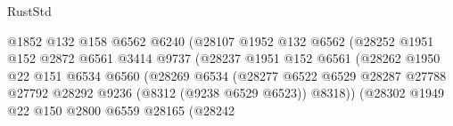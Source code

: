 \begin{lexlean}{RustStd}
\begin{coremodule}
                                            @1852
                                            @132
                                            @158
                                            @6562
                                            @6240
                                            (@28107
                                              @1952
                                              @132
                                              @6562
                                              (@28252
                                                @1951
                                                @152
                                                @2872
                                                @6561
                                                @3414
                                                @9737
                                                (@28237
                                                  @1951
                                                  @152
                                                  @6561
                                                  (@28262
                                                    @1950
                                                    @22
                                                    @151
                                                    @6534
                                                    @6560
                                                    (@28269
                                                      @6534
                                                      (@28277
                                                        @6522
                                                        @6529
                                                        @28287
                                                        @27788
                                                        @27792
                                                        @28292
                                                        @9236
                                                        (@8312 (@9238 @6529 @6523))
                                                        @8318))
                                                    (@28302
                                                      @1949
                                                      @22
                                                      @150
                                                      @2800
                                                      @6559
                                                      @28165
                                                      (@28242

\end{coremodule}
\end{lexlean}
